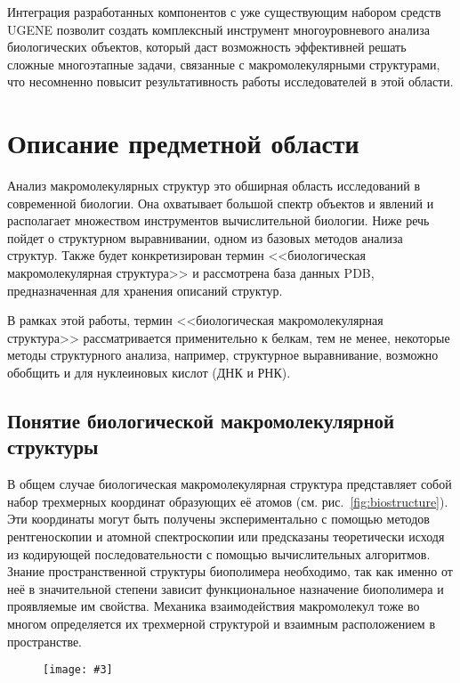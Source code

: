 \documentclass[a4paper, 12pt, titlepage, utf8]{extarticle}
\let\oldsection\section         %
\renewcommand{\section}{\newpage\oldsection}
\newenvironment{myfigure}[2]%
{\pushQED{\caption{#1} \label{#2}} %
    \begin{figure}[h!tb]\centering } %
{  \popQED %
    \end{figure}}
\newcommand{\includefigure}[3][]{
\begin{myfigure}{#2}{fig:#3}
    \texttt{[image: \#3]}
\end{myfigure}
}
\newcommand{\lookat}[1]{см. рис.~\ref{#1}}
\begin{document}
Интеграция разработанных компонентов с уже существующим набором средств UGENE позволит создать комплексный инструмент многоуровневого анализа биологических объектов, который даст возможность эффективней решать сложные многоэтапные задачи, связанные с макромолекулярными структурами, что несомненно повысит результативность работы исследователей в этой области. 


\section{Описание предметной области}	%
Анализ макромолекулярных структур это обширная область исследований в современной биологии. Она охватывает большой спектр объектов и явлений и располагает множеством инструментов вычислительной биологии. Ниже речь пойдет о структурном выравнивании, одном из базовых методов анализа структур. Также будет конкретизирован термин <<биологическая макромолекулярная структура>> и рассмотрена база данных PDB, предназначенная для хранения описаний структур.

В рамках этой работы, термин <<биологическая макромолекулярная структура>> рассматривается применительно к белкам, тем не менее, некоторые методы структурного анализа, например, структурное выравнивание, возможно обобщить и для нуклеиновых кислот (ДНК и РНК).

\subsection{Понятие биологической макромолекулярной структуры}
В общем случае биологическая макромолекулярная структура представляет собой набор трехмерных координат образующих её атомов (\lookat{fig:biostructure}). Эти координаты могут быть получены экспериментально с помощью методов рентгеноскопии и атомной спектроскопии или предсказаны теоретически исходя из кодирующей последовательности с помощью вычислительных алгоритмов. Знание пространственной структуры биополимера необходимо, так как именно от неё в значительной степени зависит функциональное назначение биополимера и проявляемые им свойства. Механика взаимодействия макромолекул тоже во многом определяется их трехмерной структурой и взаимным расположением в пространстве. 

\includefigure[width=0.8\linewidth]{Условное изображение молекулы белка (1GNA)}{biostructure}
\end{document}
